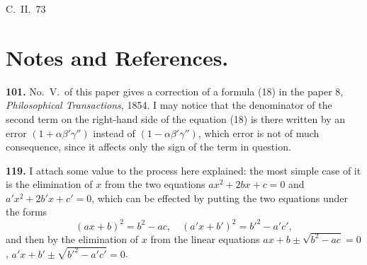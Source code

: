\documentclass[11pt,a4paper]{book}
\begin{document}
\begin{center}
\vspace{2em}
\begin{flushright}
C.~II.\ 73
\end{flushright}

\newpage

\section*{Notes and References.}

\textbf{101.} No.~V.\ of this paper gives a correction of a formula (18) in the paper 8,
\textit{Philosophical Transactions}, 1854. I may notice that the denominator of the second term
on the right-hand side of the equation (18) is there written by an error $(1+\alpha\beta'\gamma'')$
instead of $(1-\alpha\beta'\gamma'')$, which error is not of much consequence, since it affects only the sign
of the term in question.

\textbf{119.} I attach some value to the process here explained: the most simple case of
it is the elimination of $x$ from the two equations $ax^2+2bx+c=0$ and $a'x^2+2b'x+c'=0$,
which can be effected by putting the two equations under the forms
\[
(ax+b)^2 = b^2-ac,\quad (a'x+b')^2 = b'^2-a'c',
\]
and then by the elimination of $x$ from the linear equations $ax+b\pm\sqrt{b^2-ac}=0$,
$a'x+b'\pm\sqrt{b'^2-a'c'}=0$.


\end{center}
\end{document}
